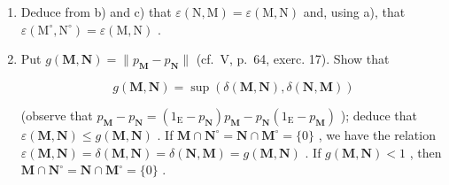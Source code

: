 \begin{enumerate}
\begin{enumerate}
\def\labelenumi{\alph{enumi})}
\item
  Let \(\tilde{\mathbf{M}}\) denote the orthogonal complement in \(\mathbf{M}\) of \(\mathbf{M} \cap \mathbf{N}^{\circ}\) , and let \(\varepsilon(\mathbf{M}, \mathbf{N}) = \delta(\tilde{\mathbf{M}}, \mathbf{N})\) . Show that (with the notations of exerc. 5) \(\ell(u_{\mathrm{NM}}) = \mathbf{M} \cap \mathbf{N}^{\circ}\) and deduce that \(\varepsilon(\mathbf{M}, \mathbf{N}) = \langle u_{\mathrm{NM}} \rangle \leqslant \delta(\mathbf{M}, \mathbf{N})\) ; moreover, if \(\mathbf{M} \cap \mathbf{N}^{\circ} = \{0\}\) (and in particular if \(\delta(\mathbf{M}, \mathbf{N}) < 1\) ), then \(\varepsilon(\mathbf{M}, \mathbf{N}) = \delta(\mathbf{M}, \mathbf{N})\) .
\item
  For a continuous linear mapping \(u\) from E into itself, we designate by conorm of \(u\) the number \(c(u) = \inf \|u(x)\|/\|x\|\) , where \(x\) ranges over the set of all vectors \(\neq 0\) orthogonal to \(u^{-1}(0)\) (if \(u = 0\) , put \(c(u) = 1\) ). For \(u(\mathrm{E})\) to be closed in E, it is necessary and sufficient that \(c(u) > 0\) (I, p.~17, th. 1). We have \(c(u^{*}) = c(u)\) .
\item
  Let \(v_{\mathbf{NM}} = p_{\mathbf{N}}p_{\mathbf{M}}\) . Show that
\end{enumerate}

\[
\varepsilon (\mathbf {M}, \mathbf {N}) ^ {2} + c (v _ {\mathbf {N M}}) ^ {2} = 1
\]

(observe that \(\|u_{\mathrm{NM}}(x)\|^{2} + \|v_{\mathrm{NM}}(x)\|^{2} = \|p_{\mathrm{M}} \cdot x\|^{2}\) , and that the kernel of \(v_{NM}\) is \(M^{\circ} + (M \cap N^{\circ})\) and deduce that \(\langle u_{NM}\rangle^{2} \leqslant 1 - c(v_{\mathrm{NM}})^{2}\) .)
\item
  Deduce from b) and c) that \(\varepsilon(\mathrm{N}, \mathrm{M}) = \varepsilon(\mathrm{M}, \mathrm{N})\) and, using a), that \(\varepsilon(\mathrm{M}^{\circ}, \mathrm{N}^{\circ}) = \varepsilon(\mathrm{M}, \mathrm{N})\) .
\item
  Put \(g(\mathbf{M}, \mathbf{N}) = \|p_{\mathbf{M}} - p_{\mathbf{N}}\|\) (cf.~V, p.~64, exerc. 17). Show that

\[
g (\mathbf {M}, \mathbf {N}) = \sup (\delta (\mathbf {M}, \mathbf {N}), \delta (\mathbf {N}, \mathbf {M}))
\]

(observe that \(p_{\mathbf{M}} - p_{\mathbf{N}} = (1_{\mathrm{E}} - p_{\mathbf{N}})p_{\mathbf{M}} - p_{\mathbf{N}}(1_{\mathrm{E}} - p_{\mathbf{M}})\) ); deduce that \(\varepsilon (\mathbf{M},\mathbf{N})\leqslant g(\mathbf{M},\mathbf{N})\) . If \(\mathbf{M}\cap \mathbf{N}^{\circ} = \mathbf{N}\cap \mathbf{M}^{\circ} = \{0\}\) , we have the relation \(\varepsilon (\mathbf{M},\mathbf{N}) = \delta (\mathbf{M},\mathbf{N}) = \delta (\mathbf{N},\mathbf{M}) = g(\mathbf{M},\mathbf{N})\) . If \(g(\mathbf{M},\mathbf{N}) < 1\) , then \(\mathbf{M}\cap \mathbf{N}^{\circ} = \mathbf{N}\cap \mathbf{M}^{\circ} = \{0\}\) .

\end{enumerate}

